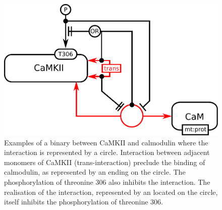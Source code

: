 \begin{figure}[H]
  \centering
  \includegraphics[scale = 0.5]{examples/ex-interaction-influences}
  \caption{Examples of a binary  between CaMKII and calmodulin where the interaction is represented by a circle. Interaction between adjacent monomers of CaMKII (trans-interaction) preclude the binding of calmodulin, as represented by an  ending on the circle. The phosphorylation of threonine 306 also inhibits the interaction. The realisation of the interaction, represented by an  located on the circle, itself inhibits the phosphorylation of threonine 306.}
  \label{fig:ex-interaction-influences}
\end{figure}
